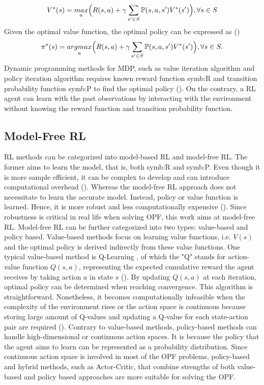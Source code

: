 \begin{equation*}
    V^{*}(s)=\underset{a}{max}\Bigl( R(s,a)+\gamma\sum_{s' \in S}\mathbb{P}(s,a,s')V^{*}(s')\Bigr), \forall s \in S
\end{equation*}
Given the optimal value function, the optimal policy can be expressed as (\cite{kaelbling1996reinforcement})
\begin{equation*}
    \pi^{*}(s)=\underset{a}{argmax}\Bigl( R(s,a)+\gamma\sum_{s' \in S}\mathbb{P}(s,a,s')V^{*}(s')\Bigr), \forall s \in S.
\end{equation*}
Dynamic programming methods for \gls{MDP}, such as value iteration algorithm and policy iteration algorithm requires known reward function \gls{symb:R} and transition probability function \gls{symb:P} to find the optimal policy (\cite{bertsekas2012dynamic}). On the contrary, a \gls{RL} agent can learn with the past observations by interacting with the environment without knowing the reward function and transition probability function. 


\subsection{Model-Free \acrlong{RL}}\label{subsec:model-free}
\gls{RL} methods can be categorized into model-based \gls{RL} and model-free \gls{RL}. The former aims to learn the model, that is, both \gls{symb:R} and \gls{symb:P}. Even though it is more sample efficient, it can be complex to develop and can introduce computational overhead (\cite{wang2019benchmarking, moerland2023model}). Whereas the model-free \gls{RL} approach does not necessitate to learn the accurate model. Instead, policy or value function is learned. Hence, it is more robust and less computationally expensive (\cite{koryakovskiy2017benchmarking,swazinna2022comparing}). Since robustness is critical in real life when solving \gls{OPF}, this work aims at model-free \gls{RL}. Model-free \gls{RL} can be further categorized into two types: value-based and policy based. Value-based methods focus on learning value functions, i.e. $V(s)$ and the optimal policy is derived indirectly from these value functions. One typical value-based method is Q-Learning , of which the "Q" stands for action-value function $Q(s,a)$, representing the expected cumulative reward the agent receives by taking action $a$ in state $s$ (\cite{tsitsiklis1994asynchronous}). By updating $Q(s,a)$ at each iteration, optimal policy can be determined when reaching convergence. This algorithm is straightforward. Nonetheless, it becomes computationally infeasible when the complexity of the environment rises or the action space is continuous because storing large amount of Q-values and updating a Q-value for each state-action pair are required (\cite{das2012improved}). Contrary to value-based methods, policy-based methods can handle high-dimensional or continuous action spaces. It is because the policy that the agent aims to learn can be represented as a probability distribution. Since  continuous action space is involved in most of the \gls{OPF} problems, policy-based and hybrid methods, such as Actor-Critic, that combine strengths of both value-based and policy based approaches are more suitable for solving the \gls{OPF}.


